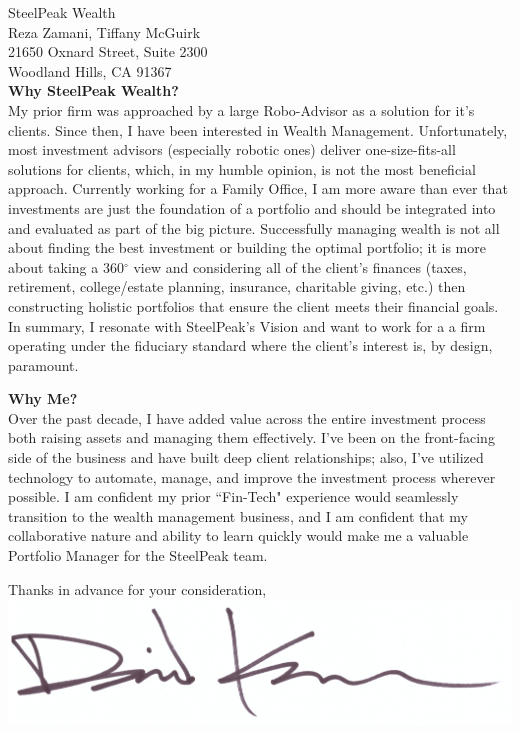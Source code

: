 \documentclass{letter}
\begin{document}
\begin{letter}{
  SteelPeak Wealth \\
  Reza Zamani, Tiffany McGuirk \\
  21650 Oxnard Street, Suite 2300 \\
  Woodland Hills, CA 91367 \\
}
\textbf{Why SteelPeak Wealth?} \\
My prior firm was approached by a large Robo-Advisor as a solution
for it's clients. Since then,  I have been interested in Wealth Management. Unfortunately,
most investment advisors (especially robotic ones) deliver one-size-fits-all
solutions for clients, which, in my humble opinion, is not the most beneficial
approach. Currently working for a Family Office, I am more aware than ever that investments are
just the foundation of a portfolio and should be integrated into and evaluated
as part of the big picture. Successfully managing wealth is not all about finding
the best investment or building the optimal portfolio; it is more about taking a
360$^{\circ}$ view and considering all of the client's finances (taxes, retirement,
college/estate planning, insurance, charitable giving, etc.) then constructing
holistic portfolios that ensure the client meets their financial goals. In summary,
I resonate with SteelPeak's Vision and want to work for a a firm operating under the
fiduciary standard where the client's interest is, by design, paramount.

\textbf{Why Me?} \\
Over the past decade, I have added value across the entire investment process
both raising assets and managing them effectively. I've been on the front-facing
side of the business and have built deep client relationships; also, I've utilized
 technology to automate, manage, and improve the investment process wherever
possible. I am confident my prior ``Fin-Tech" experience would seamlessly 
transition to the wealth management business, and I am confident that my collaborative
nature and ability to learn quickly would make me a valuable Portfolio Manager
for the SteelPeak team.
 
\closing{
  Thanks in advance for your consideration, \\
  \includegraphics[scale=0.33]{signature.png}
}

\end{letter}
\end{document}
